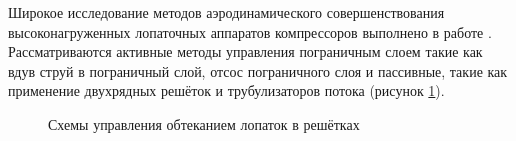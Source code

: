 Широкое исследование методов аэродинамического совершенствования высоконагруженных лопаточных аппаратов компрессоров выполнено в работе \cite{Tereschenko1988}. Рассматриваются активные методы управления пограничным слоем такие как вдув струй в пограничный слой, отсос пограничного слоя и пассивные, такие как применение двухрядных решёток и трубулизаторов  потока (рисунок \ref{fig:Tereshenko1988}).

\begin{figure} [ht]
\caption{Схемы управления обтеканием лопаток в решётках \cite{Tereschenko1988}}
\label{fig:Tereshenko1988}
\end{figure}

